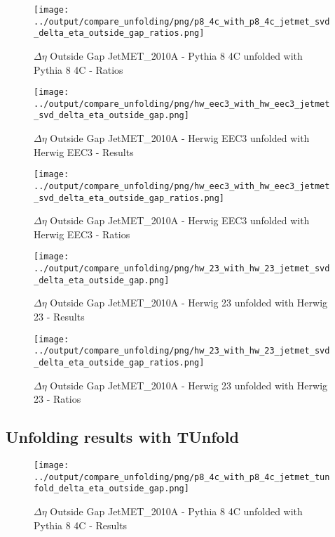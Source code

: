 \documentclass[11pt]{book}
\begin{document}
\begin{figure}[ht]
\centering
\texttt{[image: ../output/compare\_unfolding/png/p8\_4c\_with\_p8\_4c\_jetmet\_svd\_delta\_eta\_outside\_gap\_ratios.png]}
\caption{$\Delta\eta$ Outside Gap JetMET\_2010A - Pythia 8 4C unfolded with Pythia 8 4C - Ratios}
\label{p8_p8_jetmet_svd_delta_eta_outside_gap_b}
\end{figure}

\begin{figure}[ht]
\centering
\texttt{[image: ../output/compare\_unfolding/png/hw\_eec3\_with\_hw\_eec3\_jetmet\_svd\_delta\_eta\_outside\_gap.png]}
\caption{$\Delta\eta$ Outside Gap JetMET\_2010A - Herwig EEC3 unfolded with Herwig EEC3 - Results}
\label{hw_eec3_hw_eec3_jetmet_svd_delta_eta_outside_gap_a}
\end{figure}

\begin{figure}[ht]
\centering
\texttt{[image: ../output/compare\_unfolding/png/hw\_eec3\_with\_hw\_eec3\_jetmet\_svd\_delta\_eta\_outside\_gap\_ratios.png]}
\caption{$\Delta\eta$ Outside Gap JetMET\_2010A - Herwig EEC3 unfolded with Herwig EEC3 - Ratios}
\label{hw_eec3_hw_eec3_jetmet_svd_delta_eta_outside_gap_b}
\end{figure}

\begin{figure}[ht]
\centering
\texttt{[image: ../output/compare\_unfolding/png/hw\_23\_with\_hw\_23\_jetmet\_svd\_delta\_eta\_outside\_gap.png]}
\caption{$\Delta\eta$ Outside Gap JetMET\_2010A - Herwig 23 unfolded with Herwig 23 - Results}
\label{hw_23_hw_23_jetmet_svd_delta_eta_outside_gap_a}
\end{figure}

\begin{figure}[ht]
\centering
\texttt{[image: ../output/compare\_unfolding/png/hw\_23\_with\_hw\_23\_jetmet\_svd\_delta\_eta\_outside\_gap\_ratios.png]}
\caption{$\Delta\eta$ Outside Gap JetMET\_2010A - Herwig 23 unfolded with Herwig 23 - Ratios}
\label{hw_23_hw_23_jetmet_svd_delta_eta_outside_gap_b}
\end{figure}


\clearpage
\subsection{Unfolding results with TUnfold}

\begin{figure}[ht]
\centering
\texttt{[image: ../output/compare\_unfolding/png/p8\_4c\_with\_p8\_4c\_jetmet\_tunfold\_delta\_eta\_outside\_gap.png]}
\caption{$\Delta\eta$ Outside Gap JetMET\_2010A - Pythia 8 4C unfolded with Pythia 8 4C - Results}
\label{p8_p8_jetmet_tunfold_delta_eta_outside_gap_a}
\end{figure}
\end{document}
